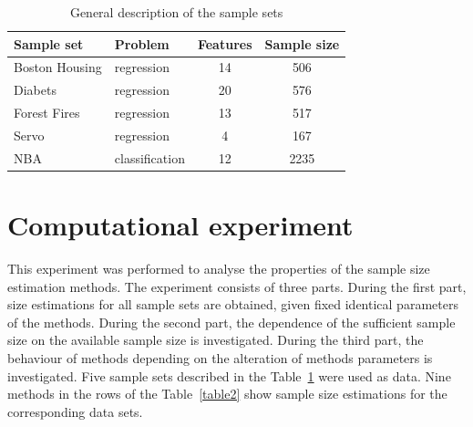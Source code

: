 \documentclass[
11pt,%
tightenlines,%
twoside,%
onecolumn,%
nofloats,%
nobibnotes,%
nofootinbib,%
superscriptaddress,%
noshowpacs,%
centertags]%
{revtex4}
\begin{document}
\begin{table}[!htp]
\centering
\caption{General description of the sample sets}
\label{table20}
\begin{tabular}{|l|l|c|c|}
\hline
	\centering Sample set & Problem & Features & Sample size\\ \hline
	\hline 	Boston Housing 	&regression		&14 & 506\\
	\hline	Diabets  				& regression		&20  & 576\\
	\hline	Forest Fires 			& regression		& 13 & 517\\
  	\hline	Servo 					& regression 	& 4   & 167\\
	\hline	NBA				 		& classification	& 12 & 2235\\
\hline
\end{tabular}
\end{table} 
	  
\section{Computational experiment}
This experiment was performed to analyse the properties of the sample size estimation methods. The experiment consists of three parts. During the first part, size estimations for all sample sets are obtained, given fixed identical parameters of the methods. During the second part, the dependence of the sufficient sample size on the available sample size is investigated. During the third part, the behaviour of methods depending on the alteration of methods parameters is investigated. Five sample sets described in the Table~\ref{table20} were used as data. Nine methods in the rows of the  Table~\ref{table2} show sample size estimations for the corresponding data sets. 
 
\end{document}
